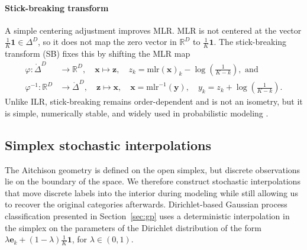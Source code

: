 \paragraph{Stick-breaking transform}
A simple centering adjustment improves MLR. MLR is not centered at the vector $\tfrac{1}{K}\boldsymbol{1} \in \Delta^D$, so it does not map the zero vector in $\mathbb{R}^D$ to $\tfrac{1}{K}\boldsymbol{1}$.
The stick-breaking transform (SB) fixes this by shifting the MLR map
\begin{equation}\label{eq:sb}
\begin{aligned}
\varphi : \mathring{\Delta}^{D} &\to \mathbb{R}^{D}, \quad
\boldsymbol{x} \mapsto \boldsymbol{z}, \quad
z_k = \mathrm{mlr}(\boldsymbol{x})_k - \log\!\left(\frac{1}{K - k}\right), 
\text{ and}
\\
\varphi^{-1} : \mathbb{R}^{D} &\to \mathring{\Delta}^{D}, \quad
\boldsymbol{z} \mapsto \boldsymbol{x}, \quad
\boldsymbol{x} = \mathrm{mlr}^{-1}(\boldsymbol{y}), \quad
y_k = z_k + \log\!\left(\frac{1}{K - k}\right).
\end{aligned}
\end{equation}
Unlike ILR, stick-breaking remains order-dependent and is not an isometry, but it is simple, numerically stable, and widely used in probabilistic modeling \citep{Carpenter2017}.

\subsection{Simplex stochastic interpolations}
The Aitchison geometry is defined  on the open simplex, but discrete observations lie on the boundary of the space. We therefore construct stochastic interpolations that move discrete labels into the interior during modeling while still allowing us to recover the original categories afterwards. Dirichlet-based Gaussian process classification presented in Section~\ref{sec:gp} uses a deterministic interpolation in the simplex on the parameters of the Dirichlet distribution of the form $\lambda \boldsymbol{e}_k + (1-\lambda) \tfrac{1}{K}\boldsymbol 1$, for $\lambda\in (0,1)$. 

